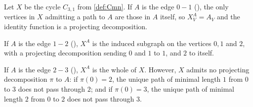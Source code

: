 \begin{example}\label{ex:proj-decomp}
Let $X$ be the cycle $C_{3,1}$ from \cref{def:Cmn}.
If $A$ is the edge $0-1$ (), the only vertices in $X$ admitting a path to $A$ are those in $A$ itself, so $X_{V}^A = A_V$ and the identity function is a projecting decomposition.

If $A$ is the edge $1-2$ (), $X^A$ is the induced subgraph on the vertices $0,1$ and $2$, with a projecting decomposition sending $0$ and $1$ to $1$, and $2$ to itself.

If $A$ is the edge $2-3$ (), $X^A$ is the whole of $X$. However, $X$ admits no projecting decomposition $\pi$ to $A$: if $\pi(0) = 2$, the unique path of minimal length $1$ from $0$ to $3$ does not pass through $2$; and if $\pi(0) = 3$, the unique path of minimal length $2$ from $0$ to $2$ does not pass through $3$.

    \begin{figure}[H]
        \centering
        \begin{subfigure}[c]{0.3\textwidth}
            \centering
            \caption{}
            \label{C31-01}
        \end{subfigure}
        \begin{subfigure}[c]{0.3\textwidth}
            \centering
\end{subfigure}
\end{figure}
\end{example}
